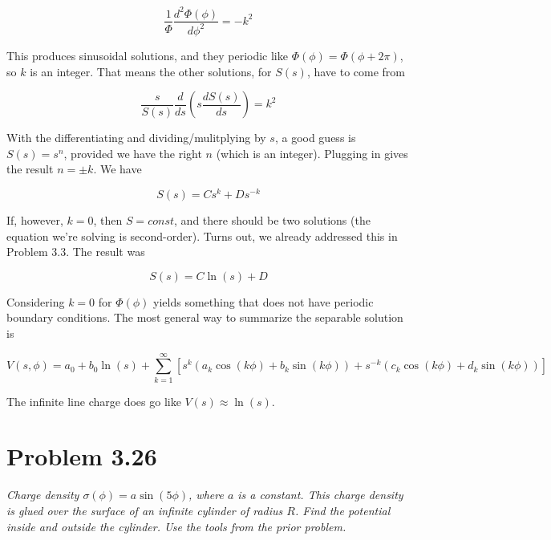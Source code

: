 \documentclass[10pt]{article}
\begin{document}
\begin{equation}
\frac{1}{\Phi} \frac{d^2\Phi(\phi)}{d\phi^2} = -k^2
\end{equation}

This produces sinusoidal solutions, and they periodic like $\Phi(\phi) = \Phi(\phi+2\pi)$, so $k$ is an integer.  That means the other solutions, for $S(s)$, have to come from

\begin{equation}
\frac{s}{S(s)}\frac{d}{d s}\left( s \frac{d S(s)}{d s} \right) = k^2
\end{equation}

With the differentiating and dividing/mulitplying by $s$, a good guess is $S(s) = s^n$, provided we have the right $n$ (which is an integer).  Plugging in gives the result $n = \pm k$.  We have

\begin{equation}
S(s) = C s^k + D s^{-k}
\end{equation}

If, however, $k = 0$, then $S = const$, and there should be two solutions (the equation we're solving is second-order).  Turns out, we already addressed this in Problem 3.3.  The result was

\begin{equation}
S(s) = C \ln(s) + D
\end{equation}

Considering $k = 0$ for $\Phi(\phi)$ yields something that does not have periodic boundary conditions.  The most general way to summarize the separable solution is 

\begin{equation}
V(s,\phi) = a_0 + b_0\ln(s) + \sum_{k=1}^{\infty}\left[ s^k(a_k\cos(k\phi) + b_k\sin(k\phi)) + s^{-k}(c_k\cos(k\phi) + d_k\sin(k\phi)) \right] \label{eq:gen}
\end{equation}

The infinite line charge does go like $V(s) \approx \ln(s)$.


\section{Problem 3.26}

\textit{Charge density $\sigma(\phi) = a \sin(5\phi)$, where $a$ is a constant.  This charge density is glued over the surface of an infinite cylinder of radius $R$.  Find the potential inside and outside the cylinder.  Use the tools from the prior problem.} \\ \\
\end{document}
